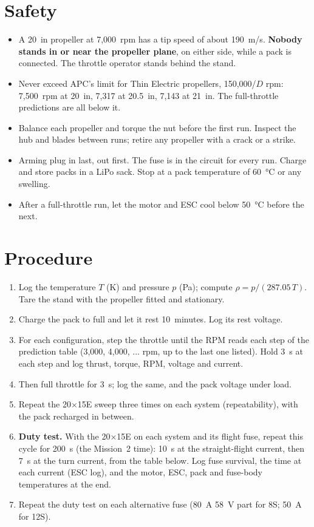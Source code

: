 \documentclass[final]{dbfdoc}
\begin{document}
\section{Safety}
\begin{itemize}
\item A 20~in propeller at 7,000~rpm has a tip speed of about 190~m/s. \textbf{Nobody stands in or near the propeller plane}, on either side, while a pack is connected. The throttle operator stands behind the stand.
\item Never exceed APC's limit for Thin Electric propellers, 150{,}000/$D$ rpm: 7,500~rpm at 20~in, 7,317 at 20.5~in, 7,143 at 21~in. The full-throttle predictions are all below it.
\item Balance each propeller and torque the nut before the first run. Inspect the hub and blades between runs; retire any propeller with a crack or a strike.
\item Arming plug in last, out first. The fuse is in the circuit for every run. Charge and store packs in a LiPo sack. Stop at a pack temperature of 60~°C or any swelling.
\item After a full-throttle run, let the motor and ESC cool below 50~°C before the next.
\end{itemize}

\section{Procedure}
\begin{enumerate}
\item Log the temperature $T$ (K) and pressure $p$ (Pa); compute $\rho = p/(287.05\,T)$. Tare the stand with the propeller fitted and stationary.
\item Charge the pack to full and let it rest 10~minutes. Log its rest voltage.
\item For each configuration, step the throttle until the RPM reads each step of the prediction table (3,000, 4,000, ... rpm, up to the last one listed). Hold 3~s at each step and log thrust, torque, RPM, voltage and current.
\item Then full throttle for 3~s; log the same, and the pack voltage under load.
\item Repeat the 20$\times$15E sweep three times on each system (repeatability), with the pack recharged in between.
\item \textbf{Duty test.} With the 20$\times$15E on each system and its flight fuse, repeat this cycle for 200~s (the Mission~2 time): 10~s at the straight-flight current, then 7~s at the turn current, from the table below. Log fuse survival, the time at each current (ESC log), and the motor, ESC, pack and fuse-body temperatures at the end.
\item Repeat the duty test on each alternative fuse (80~A 58~V part for 8S; 50~A for 12S).
\end{enumerate}
\end{document}
